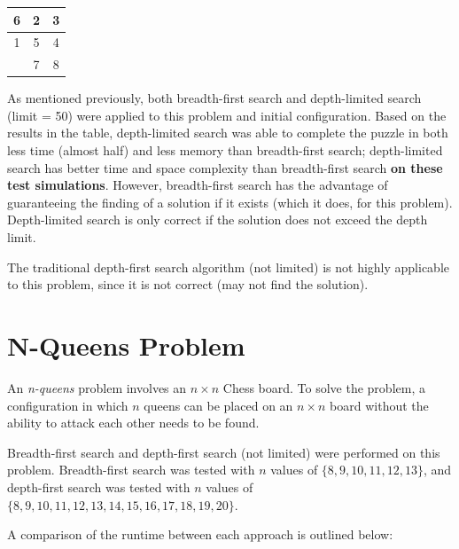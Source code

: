 \documentclass{article}
\begin{document}
    \begin{table}[H]
        \centering
        \begin{tabular}{|c|c|c|}
        \hline
        6 & 2 & 3 \\ \hline
        1 & 5 & 4 \\ \hline
          & 7 & 8 \\ \hline
        \end{tabular}
    \end{table}

As mentioned previously, both breadth-first search and depth-limited search (limit = 50) were applied to this problem and initial configuration. Based on the results in the table, depth-limited search was able to complete the puzzle in both less time (almost half) and less memory than breadth-first search; depth-limited search has better time and space complexity than breadth-first search \textbf{on these test simulations}. However, breadth-first search has the advantage of guaranteeing the finding of a solution if it exists (which it does, for this problem). Depth-limited search is only correct if the solution does not exceed the depth limit.
\\
\par The traditional depth-first search algorithm (not limited) is not highly applicable to this problem, since it is not correct (may not find the solution).

\section{N-Queens Problem}

An \textit{n-queens} problem involves an $n \times n$ Chess board. To solve the problem, a configuration in which $n$ queens can be placed on an $n \times n$ board without the ability to attack each other needs to be found.
\\
\par Breadth-first search and depth-first search (not limited) were performed on this problem. Breadth-first search was tested with $n$ values of $\{8, 9, 10, 11, 12, 13\}$, and depth-first search was tested with $n$ values of $\{8, 9, 10, 11, 12, 13, 14, 15, 16, 17, 18, 19, 20\}$.
\\
\begin{center}
    A comparison of the runtime between each approach is outlined below:
\end{center}
\end{document}
